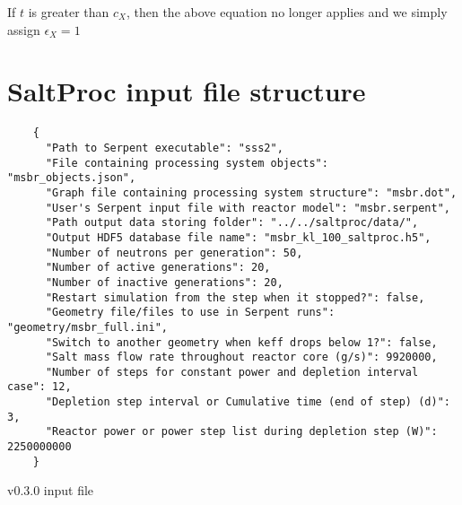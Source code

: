 If $t$ is greater than $c_{X}$, then the above equation no longer applies and we simply assign $\epsilon_{X} = 1$

\chapter{SaltProc input file structure}
\label{appex:input-files}

\begin{listing}[!ht]
    \begin{verbatim}
    {
      "Path to Serpent executable": "sss2",
      "File containing processing system objects": "msbr_objects.json",
      "Graph file containing processing system structure": "msbr.dot",
      "User's Serpent input file with reactor model": "msbr.serpent",
      "Path output data storing folder": "../../saltproc/data/",
      "Output HDF5 database file name": "msbr_kl_100_saltproc.h5",
      "Number of neutrons per generation": 50,
      "Number of active generations": 20,
      "Number of inactive generations": 20,
      "Restart simulation from the step when it stopped?": false,
      "Geometry file/files to use in Serpent runs": "geometry/msbr_full.ini",
      "Switch to another geometry when keff drops below 1?": false,
      "Salt mass flow rate throughout reactor core (g/s)": 9920000,
      "Number of steps for constant power and depletion interval case": 12,
      "Depletion step interval or Cumulative time (end of step) (d)": 3,
      "Reactor power or power step list during depletion step (W)": 2250000000
    }
    \end{verbatim}
    \caption{\SaltProc v0.3.0 input file}
    \label{listing:1}
\end{listing}

